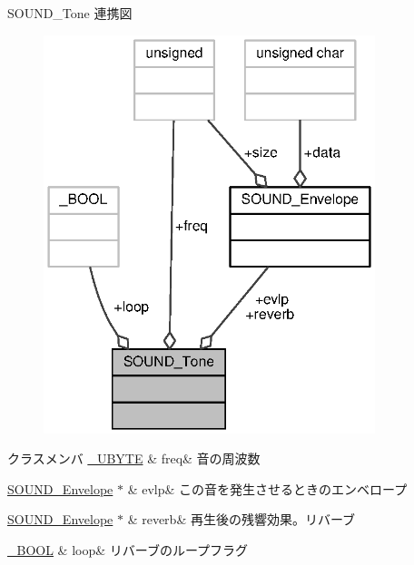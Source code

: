 S\+O\+U\+N\+D\+\_\+\+Tone 連携図
\nopagebreak
\begin{figure}[H]
\begin{center}
\leavevmode
\includegraphics[width=274pt]{d6/d5d/structSOUND__Tone__coll__graph}
\end{center}
\end{figure}
\begin{DoxyFields}{クラスメンバ}
\hyperlink{stddef_8h_aac464b47452ce9406f88ef194e2becc1_aac464b47452ce9406f88ef194e2becc1}{\+\_\+\+U\+B\+Y\+T\+E}\label{sound_8h_a8135b8035953af27550de75620afe4d5}
&
freq&
音の周波数 \\
\hline

\hyperlink{sound_8h_d0/d92/structSOUND__Envelope}{S\+O\+U\+N\+D\+\_\+\+Envelope} $\ast$\label{sound_8h_ac170c41399f920b778a6ea90b82660c3}
&
evlp&
この音を発生させるときのエンベロープ \\
\hline

\hyperlink{sound_8h_d0/d92/structSOUND__Envelope}{S\+O\+U\+N\+D\+\_\+\+Envelope} $\ast$\label{sound_8h_a4d3e0cc4845c0d851a0fbfd43dd01c02}
&
reverb&
再生後の残響効果。リバーブ \\
\hline

\hyperlink{stddef_8h_afbf708854fe02af8475a9ba02f3196cb_afbf708854fe02af8475a9ba02f3196cb}{\+\_\+\+B\+O\+O\+L}\label{sound_8h_a87a8f1fa6a5243bfec12dace400f4d95}
&
loop&
リバーブのループフラグ \\
\hline

\end{DoxyFields}


